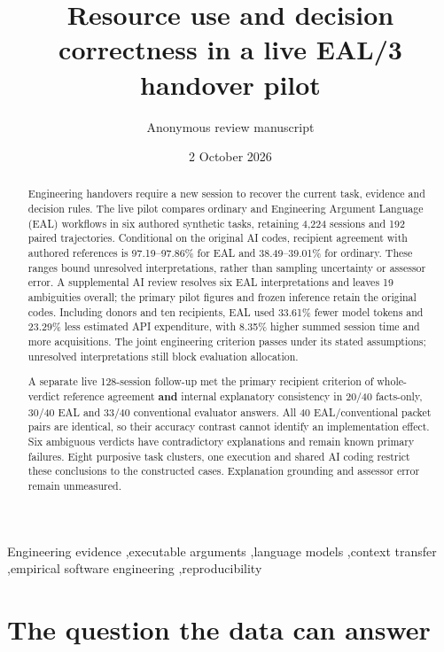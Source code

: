 \documentclass[preprint,11pt]{elsarticle}
\date{2 October 2026}
\begin{document}
\begin{frontmatter}
\title{Resource use and decision correctness in a live EAL/3 handover pilot}
\author{Anonymous review manuscript}
\begin{abstract}

Engineering handovers require a new session to recover the current task,
evidence and decision rules. The live pilot compares ordinary and
Engineering Argument Language (EAL) workflows in six authored synthetic
tasks, retaining 4,224 sessions and 192 paired trajectories. Conditional
on the original AI codes, recipient agreement with authored references
is 97.19--97.86\% for EAL and 38.49--39.01\% for ordinary. These ranges
bound unresolved interpretations, rather than sampling uncertainty or
assessor error. A supplemental AI review resolves six EAL
interpretations and leaves 19 ambiguities overall; the primary pilot
figures and frozen inference retain the original codes. Including donors
and ten recipients, EAL used 33.61\% fewer model tokens and 23.29\% less
estimated API expenditure, with 8.35\% higher summed session time and
more acquisitions. The joint engineering criterion passes under its
stated assumptions; unresolved interpretations still block evaluation
allocation.

A separate live 128-session follow-up met the primary recipient
criterion of whole-verdict reference agreement \textbf{and} internal
explanatory consistency in 20/40 facts-only, 30/40 EAL and 33/40
conventional evaluator answers. All 40 EAL/conventional packet pairs are
identical, so their accuracy contrast cannot identify an implementation
effect. Six ambiguous verdicts have contradictory explanations and
remain known primary failures. Eight purposive task clusters, one
execution and shared AI coding restrict these conclusions to the
constructed cases. Explanation grounding and assessor error remain
unmeasured.

\end{abstract}

\begin{keyword}
Engineering evidence \sep executable arguments \sep language models \sep context transfer \sep empirical software engineering \sep reproducibility
\end{keyword}
\end{frontmatter}


\FloatBarrier

\hypertarget{the-question-the-data-can-answer}{%
\section{The question the data can
answer}\label{the-question-the-data-can-answer}}
\end{document}
